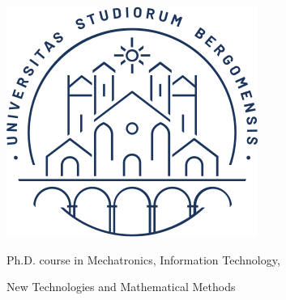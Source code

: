 \documentclass[
12pt, %
oneside, %
english, %
singlespacing, %
headsepline, %
consistentlayout, %
]{MastersDoctoralThesis} %
\author{Marco \textsc{Radavelli}} %
\newcommand{\citlab}{\textsc{CitLab}\xspace}
\theoremstyle{plain}
\theoremstyle{definition}
\theoremstyle{remark}
\theoremstyle{plain}
\theoremstyle{plain}
\theoremstyle{remark}
\begin{document}
	
\nobibliography*

\frontmatter %

\pagestyle{plain} %


\frontmatter
\begin{titlepage}
  \begin{center}
    \includegraphics[scale=0.5]{images/sigillo.png}
    
    \vspace{1cm}
    
    
    \vspace{1cm}
    
	{\huge \bfseries \ttitle\par}\vspace{0.4cm} %
	
    \vspace{1.5cm}
    
    {\huge \authorname}
    
    \vspace{.2cm}
    
    {\large Ph.D. course in Mechatronics, Information Technology,

	New Technologies and Mathematical Methods}


\end{center}
\end{titlepage}
\end{document}
